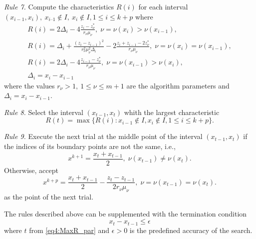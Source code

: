\emph{Rule 7.} Compute the characteristics $R(i)$ for each interval $(x_{i-1}, x_i ),\: x_{i – 1}\not\in I,\: x_i\not\in I, 1\le i\le k+p$ where
\begin{gather}
  R(i)=2\Delta_i-4\frac{z_i-z_\nu^\ast}{r_\nu \mu_\nu}, \; \nu=\nu(x_i)>\nu(x_{i-1}), \nonumber \\
  \label{eq4:characteristic_par}
  R(i)=\Delta_i+\frac{(z_i-z_{i-1})^2}{r_\nu^2 \mu_\nu^2\Delta_i}-2\frac{z_i+z_{i-1}-2z_\nu^\ast}{r_\nu \mu_\nu}, \;  \nu=\nu(x_i)=\nu(x_{i-1}),\\
  R(i)=2\Delta_i-4\frac{z_{i-1}-z_\nu^\ast}{r_\nu \mu_\nu}, \; \nu=\nu(x_{i-1})>\nu(x_i), \nonumber \\
  \Delta_i=x_i - x_{i-1} \nonumber
\end{gather}
where the values $r_\nu>1,\: 1\le\nu\le m+1$ are the algorithm parameters and $\Delta_i=x_i-x_{i-1}$.

\emph{Rule 8.} Select the interval $(x_{t-1},x_t )$ whith the largest characteristic
\begin{equation}
  \label{eq4:MaxR_par}
  R(t)=\max\{R(i):x_{i-1}\not\in I,x_{i}\not\in I,1\le i\le k+p\}.
\end{equation}

\emph{Rule 9.} Execute the next trial at the middle point of the interval $(x_{t-1},x_t )$ if the indices of its boundary points are not the same, i.e.,
\begin{equation}
  \label{eq4:next_point_1_par}
  x^{k+1} = \frac{x_t + x_{t-1}}{2}, \; \nu(x_{t-1}) \neq \nu(x_t).
\end{equation}
Otherwise, accept
\begin{equation}
\label{eq4:next_point_2_par}
x^{k+p} = \frac{x_t+x_{t-1}}{2} - \frac{z_t-z_{t-1}}{2r_\nu\mu_\nu},\; \nu=\nu(x_{t-1})=\nu(x_t).
\end{equation}
as the point of the next trial.

The rules described above can be supplemented with the termination condition
\begin{equation}
\label{eq4:stop_cond_par}
  x_t - x_{t-1}\le\epsilon
\end{equation}
where $t$ from \eqref{eq4:MaxR_par} and $\epsilon>0$ is the predefined accuracy of the search.

